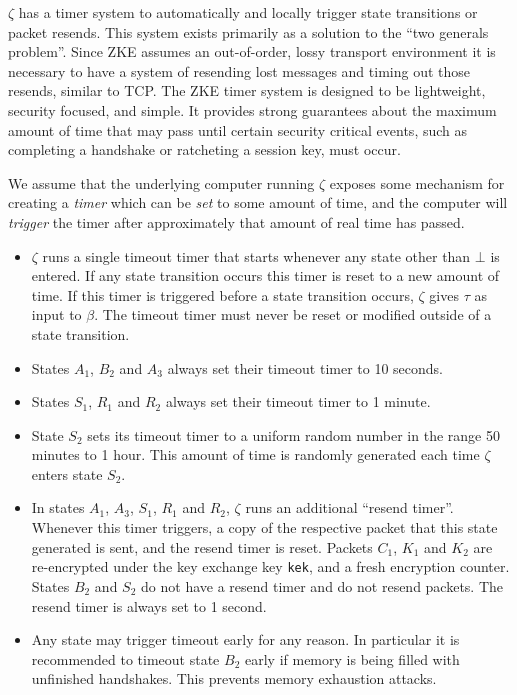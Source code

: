 \documentclass{article}
\begin{document}
\begin{definition}
	$\zeta$ has a timer system to automatically and locally trigger state transitions or packet resends. This system exists primarily as a solution to the ``two generals problem''. Since ZKE assumes an out-of-order, lossy transport environment it is necessary to have a system of resending lost messages and timing out those resends, similar to TCP. The ZKE timer system is designed to be lightweight, security focused, and simple. It provides strong guarantees about the maximum amount of time that may pass until certain security critical events, such as completing a handshake or ratcheting a session key, must occur.

	We assume that the underlying computer running $\zeta$ exposes some mechanism for creating a \emph{timer} which can be \emph{set} to some amount of time, and the computer will \emph{trigger} the timer after approximately that amount of real time has passed.
	\begin{itemize}
		\item $\zeta$ runs a single timeout timer that starts whenever any state other than $\bot$ is entered. If any state transition occurs this timer is reset to a new amount of time. If this timer is triggered before a state transition occurs, $\zeta$ gives $\tau$ as input to $\beta$. The timeout timer must never be reset or modified outside of a state transition.
		\item States $A_1$, $B_2$ and $A_3$ always set their timeout timer to 10 seconds.
		\item States $S_1$, $R_1$ and $R_2$ always set their timeout timer to 1 minute.
		\item State $S_2$ sets its timeout timer to a uniform random number in the range 50 minutes to 1 hour. This amount of time is randomly generated each time $\zeta$ enters state $S_2$.
		\item In states $A_1$, $A_3$, $S_1$, $R_1$ and $R_2$, $\zeta$ runs an additional ``resend timer''. Whenever this timer triggers, a copy of the respective packet that this state generated is sent, and the resend timer is reset. Packets $C_1$, $K_1$ and $K_2$ are re-encrypted under the key exchange key \texttt{kek}, and a fresh encryption counter. States $B_2$ and $S_2$ do not have a resend timer and do not resend packets. The resend timer is always set to 1 second.
		\item Any state may trigger timeout early for any reason. In particular it is recommended to timeout state $B_2$ early if memory is being filled with unfinished handshakes. This prevents memory exhaustion attacks.

\end{itemize}
\end{definition}
\end{document}
